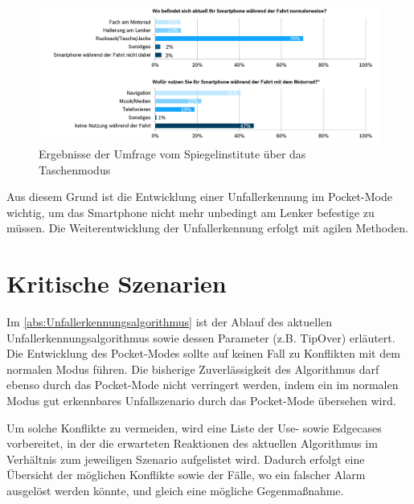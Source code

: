 

\begin{figure}
	\centering
	\includegraphics[width=\linewidth]{Bilder/SpiegelUmfragePocketMode.png}
	\caption{Ergebnisse der Umfrage vom Spiegelinstitute über das Taschenmodus}
	\label{fig:CalimotoUmfragePocketMode}
\end{figure}

Aus diesem Grund ist die Entwicklung einer Unfallerkennung im Pocket-Mode wichtig, um das Smartphone nicht mehr unbedingt am Lenker befestige zu müssen. Die Weiterentwicklung der Unfallerkennung erfolgt mit agilen Methoden.

\section{Kritische Szenarien}
Im \autoref{abs:Unfallerkennungsalgorithmus} ist der Ablauf des aktuellen Unfallerkennungsalgorithmus sowie dessen Parameter (z.B. TipOver) erläutert. Die Entwicklung des Pocket-Modes sollte auf keinen Fall zu Konflikten mit dem normalen Modus führen. Die bisherige Zuverlässigkeit des Algorithmus darf ebenso durch das Pocket-Mode nicht verringert werden, indem ein im normalen Modus gut erkennbares Unfallszenario durch das Pocket-Mode übersehen wird.

Um solche Konflikte zu vermeiden, wird eine Liste der Use- sowie Edgecases vorbereitet, in der die erwarteten Reaktionen des aktuellen Algorithmus im Verhältnis zum jeweiligen Szenario aufgelistet wird. Dadurch erfolgt eine Übersicht der möglichen Konflikte sowie der Fälle, wo ein falscher Alarm ausgelöst werden könnte, und gleich eine mögliche Gegenmaßnahme.

